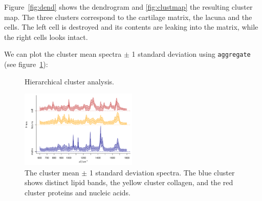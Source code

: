 \documentclass[english, a4paper, 10pt, headings=small, DIV11]{scrartcl}
\renewenvironment{Schunk}{\vspace{0pt}\begin{small}}{\end{small}\vspace{0pt}}
\newcommand{\Rfunction}[2][]{\texorpdfstring{\nohyphens{#1\texttt{#2}}}{#2}}
\begin{document}
Figure~\ref{fig:dend} shows the dendrogram and \ref{fig:clustmap}
the resulting cluster map. The three clusters correspond to the cartilage
matrix, the lacuna and the cells. The left cell is destroyed and its
contents are leaking into the matrix, while the right cells looks
intact.

We can plot the cluster mean spectra $\pm$
1 standard deviation using \Rfunction{aggregate} (see figure~\ref{fig:clustmeans}):

\begin{Schunk}
\end{Schunk}

%
\begin{figure}[tbh]
\caption{Hierarchical cluster analysis.}
\end{figure}
\begin{figure}[tbh]
\includegraphics[width=0.495\textwidth]{chondro-fig--clustmeans}
\caption{\label{fig:clustmeans} The cluster mean $\pm$ 1 standard deviation
spectra. The blue cluster shows distinct lipid bands, the yellow cluster
collagen, and the red cluster proteins and nucleic acids.}
\end{figure}
\end{document}
